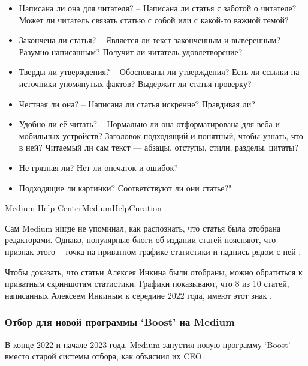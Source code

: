 {\begin{itemize}
        \item Написана ли она для читателя? –
        Написана ли статья с заботой о читателе?
        Может ли читатель связать статью с собой или с какой-то важной темой?

        \item Закончена ли статья? –
        Является ли текст законченным и выверенным?
        Разумно написанным?
        Получит ли читатель удовлетворение?

        \item Тверды ли утверждения? –
        Обоснованы ли утверждения?
        Есть ли ссылки на источники упомянутых фактов?
        Выдержит ли статья проверку?

        \item Честная ли она? –
        Написана ли статья искренне?
        Правдивая ли?

        \item Удобно ли её читать? –
        Нормально ли она отформатирована для веба и мобильных устройств?
        Заголовок подходящий и понятный, чтобы узнать, что в ней?
        Читаемый ли сам текст — абзацы, отступы, стили, разделы, цитаты?

        \item Не грязная ли?
        Нет ли опечаток и ошибок?

        \item Подходящие ли картинки?
        Соответствуют ли они статье?"

    \end{itemize}
}{Medium Help Center}{MediumHelpCuration}

Сам Medium нигде не упоминал, как распознать, что статья была отобрана редакторами.
Однако, популярные блоги об издании статей поясняют, что признак этого --
точка на приватном графике статистики и надпись  рядом с ней
.

Чтобы доказать, что статьи Алексея Инкина были отобраны, можно обратиться к приватным скриншотам статистики.
Графики показывают, что 8 из 10 статей, написанных Алексеем Инкиным к середине 2022 года, имеют этот знак .


\subsubsection{%
    Отбор для новой программы `Boost' на Medium%
}

В конце 2022 и начале 2023 года,
Medium запустил новую программу `Boost' вместо старой системы отбора,
как объяснил их CEO:

